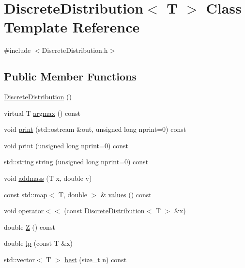 \hypertarget{class_discrete_distribution}{}\section{Discrete\+Distribution$<$ T $>$ Class Template Reference}
\label{class_discrete_distribution}


{\ttfamily \#include $<$Discrete\+Distribution.\+h$>$}

\subsection*{Public Member Functions}
\begin{DoxyCompactItemize}
\item 
\hyperlink{class_discrete_distribution_a8ffb7c55f85cf42af7aec6deb97ec4ab}{Discrete\+Distribution} ()
\item 
virtual T \hyperlink{class_discrete_distribution_a7cf660223fe0f86b61e3b33268204c06}{argmax} () const
\item 
void \hyperlink{class_discrete_distribution_a6ec6f590a3659c8bef32aaab77a8052e}{print} (std\+::ostream \&out, unsigned long nprint=0) const
\item 
void \hyperlink{class_discrete_distribution_a58bc689015e6b594ed1a53130758ba6f}{print} (unsigned long nprint=0) const
\item 
std\+::string \hyperlink{class_discrete_distribution_a87d866919f4698e488aee9ce4bc42ed5}{string} (unsigned long nprint=0) const
\item 
void \hyperlink{class_discrete_distribution_a6c41c7f4726019bc213d37d4e3cdea27}{addmass} (T x, double v)
\item 
const std\+::map$<$ T, double $>$ \& \hyperlink{class_discrete_distribution_a995377a760a6fe0d44077892053acdbb}{values} () const
\item 
void \hyperlink{class_discrete_distribution_a5c93983e2375a2353b10b82ebb11f751}{operator$<$$<$} (const \hyperlink{class_discrete_distribution}{Discrete\+Distribution}$<$ T $>$ \&x)
\item 
double \hyperlink{class_discrete_distribution_ad634a339172a69c006fded1beb423bb7}{Z} () const
\item 
double \hyperlink{class_discrete_distribution_a185ef689b1e133b962fff5bcf1443ba1}{lp} (const T \&x)
\item 
std\+::vector$<$ T $>$ \hyperlink{class_discrete_distribution_add71949e73131894f28a0fa9af3d2fc1}{best} (size\+\_\+t n) const

\end{DoxyCompactItemize}
